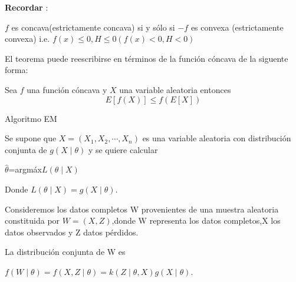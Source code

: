 \documentclass[utf8,spanish,xcolor={table,dvipsnames},12pt]{beamer}
\begin{document}
\begin{frame}

 {\large \textbf{Recordar}} :
 
 \vspace{0.3cm}
 
  $f$ es concava(estrictamente concava) si y s\'olo si $-f$ es convexa (estrictamente convexa) i.e. $f(x)\leq 0,H\leq 0 (f(x)< 0,H<0)$

\vspace{0.3cm}

 El teorema puede reescribirse en términos de la función c\'oncava de la
 siguente forma:


\vspace{0.3cm}
 
 \begin{theorem}
 	Sea $f$ una función c\'oncava y $X$ una variable aleatoria entonces
 	$$E[f(X)]\leq f(E[X])$$
 \end{theorem}
\end{frame}


\begin{frame}{Algoritmo EM}

 Se supone que $X=(X_{1},X_{2},\cdots,X_{n})$ es una variable aleatoria con distribución conjunta de $g(X\mid \theta)$ y se quiere calcular \\
 \begin{center}
   $ \widehat{\theta}$=argmáx$L(\theta\mid X)$
 \end{center}
 
 \vspace{0.2cm}
 
 Donde $L(\theta\mid X)=g(X\mid\theta)$.
 
 \vspace{0.2cm}
 
 Consideremos los datos completos W provenientes de una muestra aleatoria constituida por $W=(X,Z)$,donde W representa los datos completos,X los datos observados y Z datos pérdidos.
 
 \vspace{0.2cm}
 
 
 La distribución conjunta de W es
 \begin{center}
   $f(W\mid \theta)=f(X,Z\mid\theta)=k(Z\mid\theta,X)g(X\mid\theta)$.
 \end{center} 

 \end{frame}
 
\end{document}
